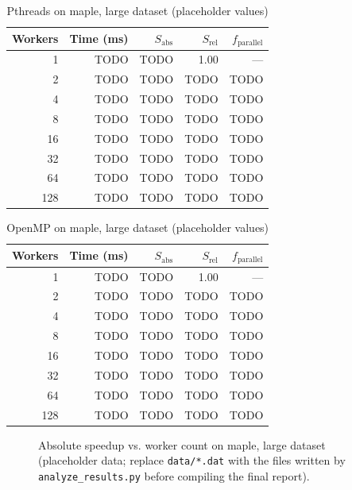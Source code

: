 \documentclass[conference]{IEEEtran}
\begin{document}
\begin{table}[htbp]
\caption{Pthreads on maple, large dataset (placeholder values)}
\label{tab:maple-threaded}
\centering
\begin{tabular}{rrrrr}
\toprule
Workers & Time (ms) & $S_{\text{abs}}$ & $S_{\text{rel}}$ & $f_{\text{parallel}}$ \\
\midrule
1   & TODO & TODO & 1.00 & --- \\
2   & TODO & TODO & TODO & TODO \\
4   & TODO & TODO & TODO & TODO \\
8   & TODO & TODO & TODO & TODO \\
16  & TODO & TODO & TODO & TODO \\
32  & TODO & TODO & TODO & TODO \\
64  & TODO & TODO & TODO & TODO \\
128 & TODO & TODO & TODO & TODO \\
\bottomrule
\end{tabular}
\end{table}

\begin{table}[htbp]
\caption{OpenMP on maple, large dataset (placeholder values)}
\label{tab:maple-openmp}
\centering
\begin{tabular}{rrrrr}
\toprule
Workers & Time (ms) & $S_{\text{abs}}$ & $S_{\text{rel}}$ & $f_{\text{parallel}}$ \\
\midrule
1   & TODO & TODO & 1.00 & --- \\
2   & TODO & TODO & TODO & TODO \\
4   & TODO & TODO & TODO & TODO \\
8   & TODO & TODO & TODO & TODO \\
16  & TODO & TODO & TODO & TODO \\
32  & TODO & TODO & TODO & TODO \\
64  & TODO & TODO & TODO & TODO \\
128 & TODO & TODO & TODO & TODO \\
\bottomrule
\end{tabular}
\end{table}

\begin{figure}[htbp]
\centering
{}
\caption{Absolute speedup vs. worker count on maple, large dataset
(placeholder data; replace \texttt{data/*.dat} with the files written by
\texttt{analyze\_results.py} before compiling the final report).}
\label{fig:maple-speedup}
\end{figure}
\end{document}

